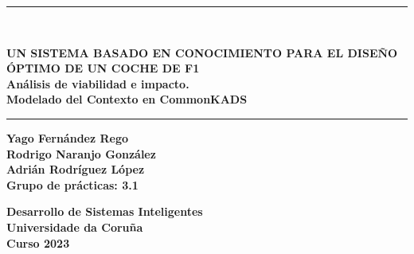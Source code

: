 \documentclass[12pt,a4paper,twoside,spanish]{article}      %
\begin{document}
\def\chaptername{Capítulo}
\def\tablename{Tabla}
\def\listtablename{Índice de Tablas}
\chapterfont{\LARGE\raggedleft}

\pagestyle{empty}

\begin{titlepage}
\setlength{\parindent}{0cm} \setlength{\parskip}{0cm}
\newcommand{\HRule}{\rule{\linewidth}{1mm}}

\vspace*{2cm}
\HRule \\[0.5cm]
\begin{center}
\textsf{\textbf{\large UN SISTEMA BASADO EN CONOCIMIENTO PARA EL DISEÑO ÓPTIMO DE UN COCHE DE F1\\[1.5cm]
Análisis de viabilidad e impacto. \\[0.25cm] Modelado del Contexto en CommonKADS \\[0.5cm]}}
\HRule \vspace*{4cm}

\textsf{\textbf{\normalsize Yago Fernández Rego\\Rodrigo Naranjo González\\Adrián Rodríguez López\\[1cm]
Grupo de prácticas: 3.1\\[3.5cm]}}

\textsf{\textbf{\small Desarrollo de Sistemas Inteligentes\\
Universidade da Coruña \\ Curso 2023}}
\end{center}
\end{titlepage}

\cleardoublepage


\tableofcontents
\cleardoublepage


\end{document}
